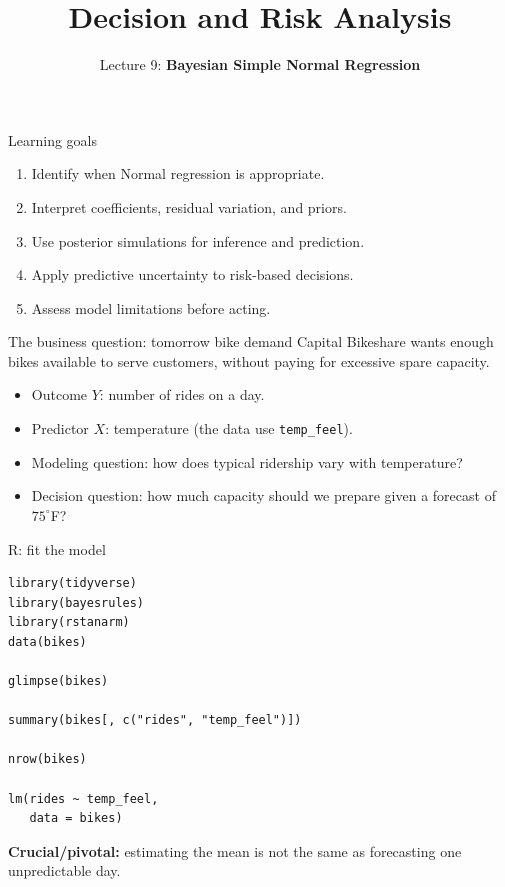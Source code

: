 \documentclass[aspectratio=43,11pt]{beamer}
\title{Decision and Risk Analysis}
\subtitle{Lecture 9: \textbf{Bayesian Simple Normal Regression}}
\author{}
\date{\color{aggiemaroon}{DAEN 427 / ISEN 427 / ISEN 627 - Fall 2026\\
      \textbf{Alexander Abuabara}}}
\begin{document}
\begin{frame}
\titlepage
\end{frame}

\begin{frame}{Learning goals}
\begin{enumerate}
\item Identify when Normal regression is appropriate.
\item Interpret coefficients, residual variation, and priors.
\item Use posterior simulations for inference and prediction.
\item Apply predictive uncertainty to risk-based decisions.
\item Assess model limitations before acting.
\end{enumerate}
\end{frame}

\begin{frame}{The business question: tomorrow bike demand}
Capital Bikeshare wants enough bikes available to serve customers, without paying for excessive spare capacity.
\begin{itemize}
\item Outcome $Y$: number of rides on a day.
\item Predictor $X$: temperature (the data use \texttt{temp\_feel}).
\item Modeling question: how does typical ridership vary with temperature?
\item Decision question: how much capacity should we prepare given a forecast of $75^\circ$F?
\end{itemize}
\end{frame}

\begin{frame}[fragile]{R: fit the model}
\footnotesize
\begin{verbatim}
library(tidyverse)
library(bayesrules)
library(rstanarm)
data(bikes)

glimpse(bikes)

summary(bikes[, c("rides", "temp_feel")])

nrow(bikes)

lm(rides ~ temp_feel,
   data = bikes)
\end{verbatim}
\par\medskip\textbf{Crucial/pivotal:} estimating the mean is not the same as forecasting one unpredictable day.
\end{frame}
\end{document}
